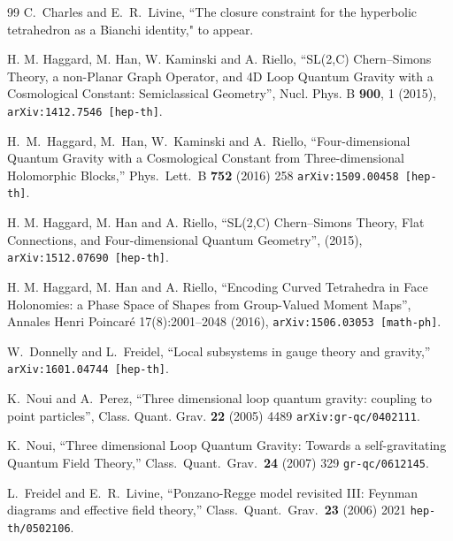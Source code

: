\documentclass[nofootinbib,superscriptaddress,eqsecnum,tightenlines,11pt]{revtex4-1}
\begin{document}
\begin{thebibliography}{99}
   C.~Charles and E.~R.~Livine,
 ``The closure constraint for the hyperbolic tetrahedron as a Bianchi identity," to appear.
 
 H. M. Haggard, M. Han, W. Kaminski and A. Riello,
``SL(2,C) Chern--Simons Theory, a non-Planar Graph Operator, and 4D Loop Quantum Gravity with a Cosmological Constant: Semiclassical Geometry'',
Nucl. Phys. B \textbf{900}, 1 (2015), \texttt{arXiv:1412.7546 [hep-th]}.

  H.~M.~Haggard, M.~Han, W.~Kaminski and A.~Riello,
  ``Four-dimensional Quantum Gravity with a Cosmological Constant from Three-dimensional Holomorphic Blocks,''
  Phys.\ Lett.\ B {\bf 752} (2016) 258
  \texttt{arXiv:1509.00458 [hep-th]}.

H. M. Haggard, M. Han and A. Riello,
``SL(2,C) Chern--Simons Theory, Flat Connections, and Four-dimensional Quantum Geometry'',
(2015), \texttt{arXiv:1512.07690 [hep-th]}.

 H. M. Haggard, M. Han and A. Riello,
``Encoding Curved Tetrahedra in Face Holonomies: a Phase Space of Shapes from Group-Valued Moment Maps'',
Annales Henri Poincar\'e 17(8):2001--2048 (2016), \texttt{arXiv:1506.03053 [math-ph]}.


 W.~Donnelly and L.~Freidel,
  ``Local subsystems in gauge theory and gravity,''
  \texttt{arXiv:1601.04744 [hep-th]}.
  
K.~Noui and A.~Perez,
``Three dimensional loop quantum gravity: coupling to point particles'',
Class. Quant. Grav. \textbf{22} (2005) 4489  \texttt{arXiv:gr-qc/0402111}.

  K.~Noui,
  ``Three dimensional Loop Quantum Gravity: Towards a self-gravitating Quantum Field Theory,''
  Class.\ Quant.\ Grav.\  {\bf 24} (2007) 329
  \texttt{gr-qc/0612145}.
 
  
     L.~Freidel and E.~R.~Livine,
  ``Ponzano-Regge model revisited III: Feynman diagrams and effective field theory,''
  Class.\ Quant.\ Grav.\  {\bf 23} (2006) 2021
  \texttt{hep-th/0502106}.


\end{thebibliography}
\end{document}
